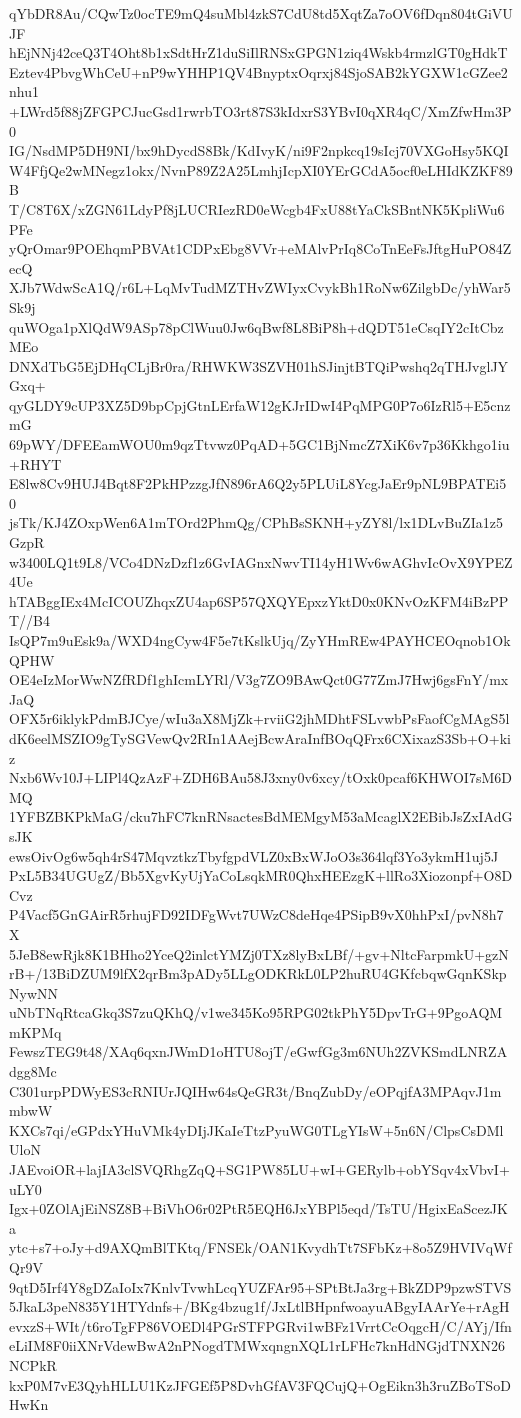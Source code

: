 qYbDR8Au/CQwTz0ocTE9mQ4suMbl4zkS7CdU8td5XqtZa7oOV6fDqn804tGiVUJF
hEjNNj42ceQ3T4Oht8b1xSdtHrZ1duSiIlRNSxGPGN1ziq4Wskb4rmzlGT0gHdkT
Eztev4PbvgWhCeU+nP9wYHHP1QV4BnyptxOqrxj84SjoSAB2kYGXW1cGZee2nhu1
+LWrd5f88jZFGPCJucGsd1rwrbTO3rt87S3kIdxrS3YBvI0qXR4qC/XmZfwHm3P0
IG/NsdMP5DH9NI/bx9hDycdS8Bk/KdIvyK/ni9F2npkcq19sIcj70VXGoHsy5KQI
W4FfjQe2wMNegz1okx/NvnP89Z2A25LmhjIcpXI0YErGCdA5ocf0eLHIdKZKF89B
T/C8T6X/xZGN61LdyPf8jLUCRIezRD0eWcgb4FxU88tYaCkSBntNK5KpliWu6PFe
yQrOmar9POEhqmPBVAt1CDPxEbg8VVr+eMAlvPrIq8CoTnEeFsJftgHuPO84ZecQ
XJb7WdwScA1Q/r6L+LqMvTudMZTHvZWIyxCvykBh1RoNw6ZilgbDc/yhWar5Sk9j
quWOga1pXlQdW9ASp78pClWuu0Jw6qBwf8L8BiP8h+dQDT51eCsqIY2cItCbzMEo
DNXdTbG5EjDHqCLjBr0ra/RHWKW3SZVH01hSJinjtBTQiPwshq2qTHJvglJYGxq+
qyGLDY9cUP3XZ5D9bpCpjGtnLErfaW12gKJrIDwI4PqMPG0P7o6IzRl5+E5cnzmG
69pWY/DFEEamWOU0m9qzTtvwz0PqAD+5GC1BjNmcZ7XiK6v7p36Kkhgo1iu+RHYT
E8lw8Cv9HUJ4Bqt8F2PkHPzzgJfN896rA6Q2y5PLUiL8YcgJaEr9pNL9BPATEi50
jsTk/KJ4ZOxpWen6A1mTOrd2PhmQg/CPhBsSKNH+yZY8l/lx1DLvBuZIa1z5GzpR
w3400LQ1t9L8/VCo4DNzDzf1z6GvIAGnxNwvTI14yH1Wv6wAGhvIcOvX9YPEZ4Ue
hTABggIEx4McICOUZhqxZU4ap6SP57QXQYEpxzYktD0x0KNvOzKFM4iBzPPT//B4
IsQP7m9uEsk9a/WXD4ngCyw4F5e7tKslkUjq/ZyYHmREw4PAYHCEOqnob1OkQPHW
OE4eIzMorWwNZfRDf1ghIcmLYRl/V3g7ZO9BAwQct0G77ZmJ7Hwj6gsFnY/mxJaQ
OFX5r6iklykPdmBJCye/wIu3aX8MjZk+rviiG2jhMDhtFSLvwbPsFaofCgMAgS5l
dK6eelMSZIO9gTySGVewQv2RIn1AAejBcwAraInfBOqQFrx6CXixazS3Sb+O+kiz
Nxb6Wv10J+LIPl4QzAzF+ZDH6BAu58J3xny0v6xcy/tOxk0pcaf6KHWOI7sM6DMQ
1YFBZBKPkMaG/cku7hFC7knRNsactesBdMEMgyM53aMcaglX2EBibJsZxIAdGsJK
ewsOivOg6w5qh4rS47MqvztkzTbyfgpdVLZ0xBxWJoO3s364lqf3Yo3ykmH1uj5J
PxL5B34UGUgZ/Bb5XgvKyUjYaCoLsqkMR0QhxHEEzgK+llRo3Xiozonpf+O8DCvz
P4Vacf5GnGAirR5rhujFD92IDFgWvt7UWzC8deHqe4PSipB9vX0hhPxI/pvN8h7X
5JeB8ewRjk8K1BHho2YceQ2inlctYMZj0TXz8lyBxLBf/+gv+NltcFarpmkU+gzN
rB+/13BiDZUM9lfX2qrBm3pADy5LLgODKRkL0LP2huRU4GKfcbqwGqnKSkpNywNN
uNbTNqRtcaGkq3S7zuQKhQ/v1we345Ko95RPG02tkPhY5DpvTrG+9PgoAQMmKPMq
FewszTEG9t48/XAq6qxnJWmD1oHTU8ojT/eGwfGg3m6NUh2ZVKSmdLNRZAdgg8Mc
C301urpPDWyES3cRNIUrJQIHw64sQeGR3t/BnqZubDy/eOPqjfA3MPAqvJ1mmbwW
KXCs7qi/eGPdxYHuVMk4yDIjJKaIeTtzPyuWG0TLgYIsW+5n6N/ClpsCsDMlUloN
JAEvoiOR+lajIA3clSVQRhgZqQ+SG1PW85LU+wI+GERylb+obYSqv4xVbvI+uLY0
Igx+0ZOlAjEiNSZ8B+BiVhO6r02PtR5EQH6JxYBPl5eqd/TsTU/HgixEaScezJKa
ytc+s7+oJy+d9AXQmBlTKtq/FNSEk/OAN1KvydhTt7SFbKz+8o5Z9HVIVqWfQr9V
9qtD5Irf4Y8gDZaIoIx7KnlvTvwhLcqYUZFAr95+SPtBtJa3rg+BkZDP9pzwSTVS
5JkaL3peN835Y1HTYdnfs+/BKg4bzug1f/JxLtlBHpnfwoayuABgyIAArYe+rAgH
evxzS+WIt/t6roTgFP86VOEDl4PGrSTFPGRvi1wBFz1VrrtCcOqgcH/C/AYj/Ifn
eLiIM8F0iiXNrVdewBwA2nPNogdTMWxqngnXQL1rLFHc7knHdNGjdTNXN26NCPkR
kxP0M7vE3QyhHLLU1KzJFGEf5P8DvhGfAV3FQCujQ+OgEikn3h3ruZBoTSoDHwKn
